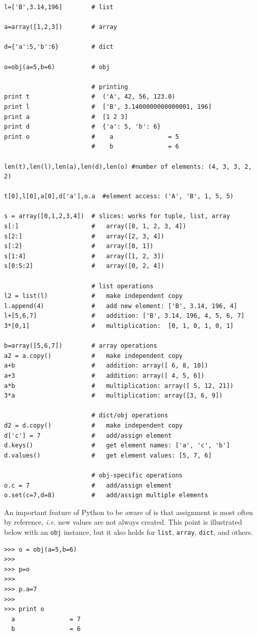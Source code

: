 {\begin{shaded}
\begin{verbatim}
l=['B',3.14,196]        # list

a=array([1,2,3])        # array

d={'a':5,'b':6}         # dict

o=obj(a=5,b=6)          # obj

                        # printing
print t                 #  ('A', 42, 56, 123.0)
print l                 #  ['B', 3.1400000000000001, 196]
print a                 #  [1 2 3]
print d                 #  {'a': 5, 'b': 6}
print o                 #    a               = 5
                        #    b               = 6

len(t),len(l),len(a),len(d),len(o) #number of elements: (4, 3, 3, 2, 2)

t[0],l[0],a[0],d['a'],o.a  #element access: ('A', 'B', 1, 5, 5)

s = array([0,1,2,3,4])  # slices: works for tuple, list, array
s[:]                    #   array([0, 1, 2, 3, 4])
s[2:]                   #   array([2, 3, 4])
s[:2]                   #   array([0, 1])
s[1:4]                  #   array([1, 2, 3])
s[0:5:2]                #   array([0, 2, 4])

                        # list operations
l2 = list(l)            #   make independent copy
l.append(4)             #   add new element: ['B', 3.14, 196, 4]
l+[5,6,7]               #   addition: ['B', 3.14, 196, 4, 5, 6, 7]
3*[0,1]                 #   multiplication:  [0, 1, 0, 1, 0, 1]

b=array([5,6,7])        # array operations
a2 = a.copy()           #   make independent copy
a+b                     #   addition: array([ 6, 8, 10])
a+3                     #   addition: array([ 4, 5, 6])
a*b                     #   multiplication: array([ 5, 12, 21])
3*a                     #   multiplication: array([3, 6, 9])

                        # dict/obj operations
d2 = d.copy()           #   make independent copy
d['c'] = 7              #   add/assign element 
d.keys()                #   get element names: ['a', 'c', 'b']
d.values()              #   get element values: [5, 7, 6]

                        # obj-specific operations
o.c = 7                 #   add/assign element
o.set(c=7,d=8)          #   add/assign multiple elements

\end{verbatim}
\end{shaded}
An important feature of Python to be aware of is that assignment is most often by reference, \emph{i.e.} new values are not always created.  This point is illustrated below with an \texttt{obj} instance, but it also holds for \texttt{list}, \texttt{array}, \texttt{dict}, and others.
\begin{shaded}
\begin{verbatim}
>>> o = obj(a=5,b=6)
>>> 
>>> p=o
>>> 
>>> p.a=7
>>> 
>>> print o
  a               = 7
  b               = 6


\end{verbatim}
\end{shaded}}
